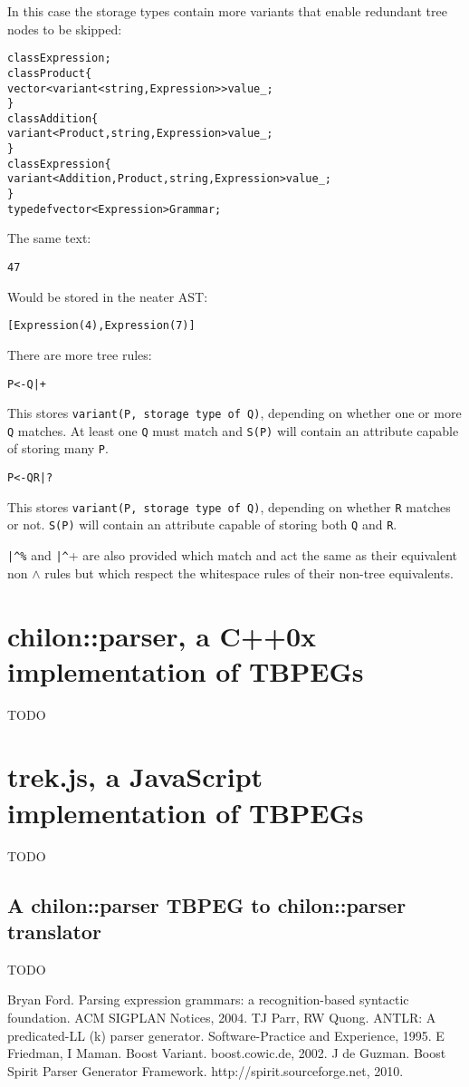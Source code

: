 \documentclass[a4paper,11pt]{article}
\begin{document}
In this case the storage types contain more variants that enable redundant tree nodes to be skipped:
\begin{alltt}
    class Expression;
    class Product \{
         vector< variant<string, Expression> > value\_;
    \}
    class Addition \{
         variant<Product, string, Expression> value\_;
    \}
    class Expression \{
        variant<Addition, Product, string, Expression> value\_;
    \}
    typedef vector<Expression> Grammar;
\end{alltt}

The same text:
\begin{alltt}
    4 7
\end{alltt}

Would be stored in the neater AST:
\begin{alltt}
    [ Expression(4), Expression(7) ]
\end{alltt}

There are more tree rules:
\begin{alltt}
    P <- Q|+
\end{alltt}

This stores \verb+variant(P, storage type of Q)+, depending on whether one or more \verb+Q+ matches.
At least one \verb+Q+ must match and \verb+S(P)+ will contain an attribute capable of storing many \verb+P+.

\begin{alltt}
    P <- Q R|?
\end{alltt}

This stores \verb+variant(P, storage type of Q)+, depending on whether \verb+R+ matches or not.
\verb+S(P)+ will contain an attribute capable of storing both \verb+Q+ and \verb+R+.

\verb+|^%+ and \verb+|^++ are also provided which match and act the same as their equivalent non $\wedge$ rules but which respect the whitespace rules of their non-tree equivalents.

\section{chilon::parser, a C++0x implementation of TBPEGs}
TODO

\section{trek.js, a JavaScript implementation of TBPEGs}
TODO

\subsection{A chilon::parser TBPEG to chilon::parser translator}
TODO

\begin{thebibliography}{9}
 Bryan Ford. Parsing expression grammars: a recognition-based syntactic foundation. ACM SIGPLAN Notices, 2004.
 TJ Parr, RW Quong. ANTLR: A predicated-LL (k) parser generator. Software-Practice and Experience, 1995.
 E Friedman, I Maman. Boost Variant. boost.cowic.de, 2002.
 J de Guzman. Boost Spirit Parser Generator Framework. http://spirit.sourceforge.net, 2010.
\end{thebibliography}
\end{document}
